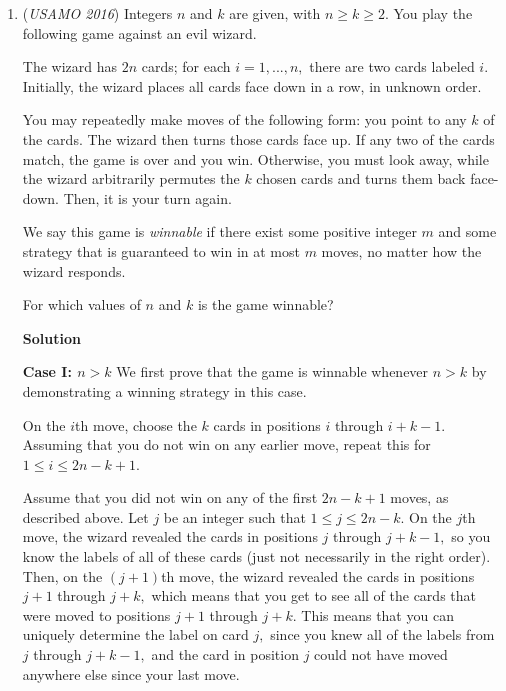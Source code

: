 \begin{enumerate}
 This sum is parallel to $\ell,$, so we are done.

 <i>\textbf{Claim}</i>

 Let $|\overline{BA}|= |\overline{CD}|, \overline{CB} + |\overline{BA} + |\overline{AD} = |\overline{CD}.$Then $(\overline{BA} + \overline{CD}) \perp (\overline{CB} + \overline{AD}).$
<i>\textbf{Proof}</i>
$(\overline{BA} + \overline{CD}) \cdot (\overline{CB} + \overline{AD}) = (\overline{BA} + \overline{CD}) \cdot (\overline{CB} + \overline{CD} – \overline{CB} – \overline{BA}) = |\overline{CD}|^2 – |\overline{BA}|^2 = 0.$

 \textbf{vladimir.shelomovskii@gmail.com, vvsss}

 


	\item (\textit{USAMO 2016}) Integers $n$ and $k$ are given, with $n\ge k\ge 2.$ You play the following game against an evil wizard.


 The wizard has $2n$ cards; for each $i = 1, ..., n,$ there are two cards labeled $i.$ Initially, the wizard places all cards face down in a row, in unknown order.


 You may repeatedly make moves of the following form: you point to any $k$ of the cards. The wizard then turns those cards face up. If any two of the cards match, the game is over and you win. Otherwise, you must look away, while the wizard arbitrarily permutes the $k$ chosen cards and turns them back face-down. Then, it is your turn again.


 We say this game is \textit{winnable} if there exist some positive integer $m$ and some strategy that is guaranteed to win in at most $m$ moves, no matter how the wizard responds.


 For which values of $n$ and $k$ is the game winnable?


 



\textbf{Solution}

\textbf{Case I: $n>k$} We first prove that the game is winnable whenever $n > k$ by demonstrating a winning strategy in this case.

 On the $i$th move, choose the $k$ cards in positions $i$ through $i+k-1.$ Assuming that you do not win on any earlier move, repeat this for $1\le i \le 2n-k+1.$

 Assume that you did not win on any of the first $2n-k+1$ moves, as described above. Let $j$ be an integer such that $1\le j\le 2n-k.$ On the $j$th move, the wizard revealed the cards in positions $j$ through $j+k-1,$ so you know the labels of all of these cards (just not necessarily in the right order). Then, on the $(j+1)$th move, the wizard revealed the cards in positions $j+1$ through $j+k,$ which means that you get to see all of the cards that were moved to positions $j+1$ through $j+k.$ This means that you can uniquely determine the label on card $j,$ since you knew all of the labels from $j$ through $j+k-1,$ and the card in position $j$ could not have moved anywhere else since your last move.


\end{enumerate}
